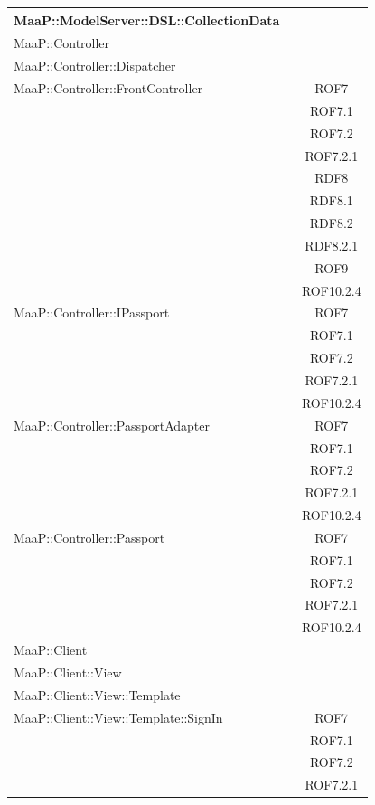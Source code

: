 \begin{center}
\begin{longtable}{|p{0.8\linewidth}|c|}
\midrule 
MaaP::ModelServer::DSL::CollectionData
& \\

\midrule 
MaaP::Controller 
& \\

\midrule 
MaaP::Controller::Dispatcher
& \\

\midrule 
MaaP::Controller::FrontController
& ROF7\\
& ROF7.1\\
& ROF7.2\\
& ROF7.2.1\\
& RDF8\\
& RDF8.1\\
& RDF8.2\\
& RDF8.2.1\\
& ROF9\\
& ROF10.2.4\\

\midrule 
MaaP::Controller::IPassport
& ROF7\\
& ROF7.1\\
& ROF7.2\\
& ROF7.2.1\\
& ROF10.2.4\\

\midrule 
MaaP::Controller::PassportAdapter 
& ROF7\\
& ROF7.1\\
& ROF7.2\\
& ROF7.2.1\\
& ROF10.2.4\\

\midrule 
MaaP::Controller::Passport
& ROF7\\
& ROF7.1\\
& ROF7.2\\
& ROF7.2.1\\
& ROF10.2.4\\

\midrule 
MaaP::Client 
& \\

\midrule 
MaaP::Client::View 
& \\

\midrule 
MaaP::Client::View::Template
& \\

\midrule 
MaaP::Client::View::Template::SignIn
& ROF7\\
& ROF7.1\\
& ROF7.2\\
& ROF7.2.1\\


\end{longtable}
\end{center}
